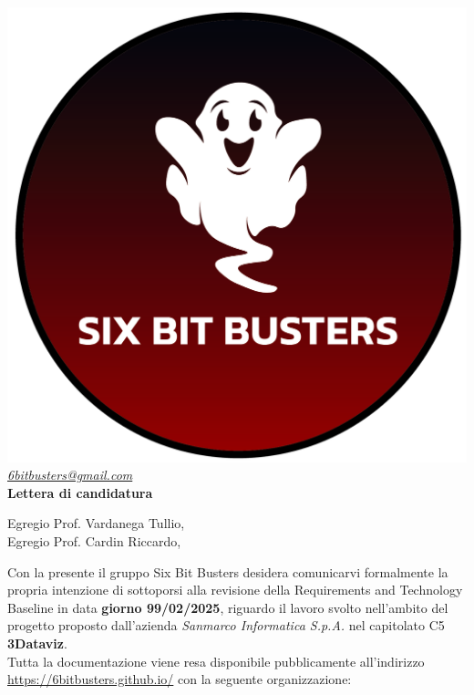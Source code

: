 \thispagestyle{empty}
\renewcommand{\arraystretch}{1.0}


\begin{titlepage}
	\begin{center}
	\includegraphics[scale = 0.5]{template/images/logo-circle.png}
	\\[1cm]
	\href{mailto:6bitbusters@gmail.com}		      	
	{\large{\textit{6bitbusters@gmail.com} } }\\[1cm]
	
	{\Huge{ \textbf{Lettera di candidatura} } }\\[1cm]
        \end{center}
        Egregio Prof. Vardanega Tullio, \\
        Egregio Prof. Cardin Riccardo,
        \newline

        Con la presente il gruppo Six Bit Busters desidera comunicarvi formalmente la propria
        intenzione di sottoporsi alla revisione della Requirements and Technology Baseline in data \textbf{giorno 99/02/2025}, riguardo il lavoro svolto nell'ambito del progetto proposto dall'azienda \textit{Sanmarco Informatica S.p.A.}
        nel capitolato C5 \textbf{3Dataviz}.\\

        Tutta la documentazione viene resa disponibile pubblicamente all'indirizzo \url{https://6bitbusters.github.io/} con la
        seguente organizzazione:


\end{titlepage}
